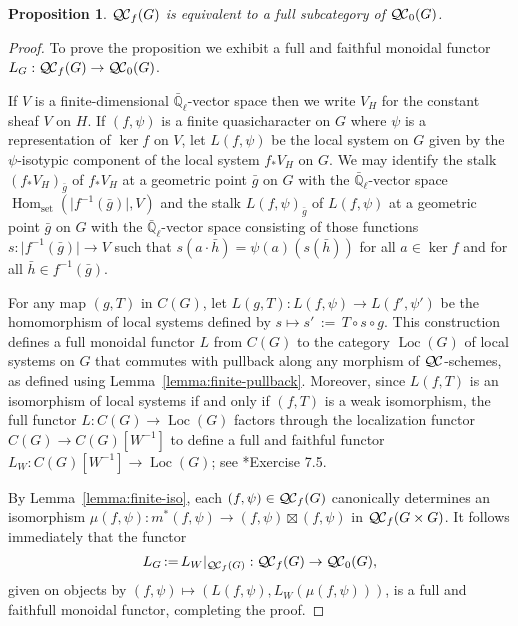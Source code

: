 \documentclass{amsart}
\theoremstyle{plain}
\newtheorem{proposition}[theorem]{Proposition}
\theoremstyle{definition}
\theoremstyle{remark}
\newcommand{\EE}{\mathbb{\bar Q}_\ell}
\DeclareMathOperator{\Hom}{Hom}
\DeclareMathOperator{\Loc}{Loc}
\newcommand{\abs}[1]{{\vert #1 \vert}}
\newcommand{\ceq}{{\, :=\, }}
\newcommand{\QC}{{\mathcal{Q\hskip-0.8pt C}}}
\newcommand{\QCb}{{\QC_0}}
\newcommand{\QCf}{{\QC_f}}
\begin{document}
\begin{proposition}\label{prop:bounded}
 $\QCf(G)$ is equivalent to a full subcategory of $\QCb(G)$.
\end{proposition}

\begin{proof}
 To prove the proposition we exhibit a full and faithful monoidal functor $L_G : \QCf(G) \to \QCb(G)$.

 If $V$ is a finite-dimensional $\EE$-vector space then we write $V_H$ for the constant sheaf $V$ on $H$.
If $(f,\psi)$ is a finite quasicharacter on $G$ where $\psi$ is a representation of $\ker f$ on $V$, 
let $L(f,\psi)$ be the local system on $G$ given by the $\psi$-isotypic component of the local system $f_* V_H$ on $G$.
 We may identify the stalk $(f_* V_H)_{\bar g}$ of $f_* V_H$ at a geometric point ${\bar g}$ on $G$ 
 with the $\EE$-vector space $\Hom_\text{set}(\abs{f^{-1}({\bar g})},V)$ 
 and the stalk $L(f,\psi)_{\bar g}$ of $L(f,\psi)$ at a geometric point ${\bar g}$ on $G$ 
 with the $\EE$-vector space consisting of those functions $s: \abs{f^{-1}({\bar g})} \to V$ such that 
 $s(a\cdot {\bar h}) = \psi(a)(s({\bar h}))$ for all $a\in \ker f$ and for all ${\bar h} \in f^{-1}({\bar g})$.

 For any map $(g,T)$ in $C(G)$, let $L(g,T) : L(f,\psi) \to L(f',\psi')$ be the homomorphism of local systems defined 
 by $s \mapsto s' \ceq T\circ s\circ g$. 
 This construction defines a full monoidal functor $L$ from $C(G)$ to the category $\Loc(G)$ of local systems on $G$ that
 commutes with pullback along any morphism of $\QC$-schemes,
 as defined using Lemma~\ref{lemma:finite-pullback}.
 Moreover, since $L(f,T)$ is an isomorphism of local systems
 if and only if $(f,T)$ is a weak isomorphism, 
 the full functor $L : C(G) \to \Loc(G)$ factors through the localization functor $C(G) \to C(G)[W^{-1}]$ 
 to define a full and faithful functor $L_{W} : C(G)[W^{-1}] \to \Loc(G)$;
 see \cite{kashiwara-schapira:CatgoriesSheaves}*{Exercise 7.5}.  
   
 By Lemma~\ref{lemma:finite-iso}, each $(f,\psi) \in \QCf(G)$ canonically determines 
 an isomorphism $\mu(f,\psi) : m^*(f,\psi) \to (f,\psi) \boxtimes (f,\psi)$ in $\QCf(G\times G)$.
 It follows immediately that the functor 
 \[
 L_G  \ceq  L_{W}\vert_{\QCf(G)} : \QCf(G) \to \QCb(G),
 \] 
 given on objects by $(f,\psi) \mapsto (L(f,\psi), L_{W}(\mu(f,\psi)))$,
 is a full and faithfull monoidal functor, completing the proof.
\end{proof}
\end{document}

